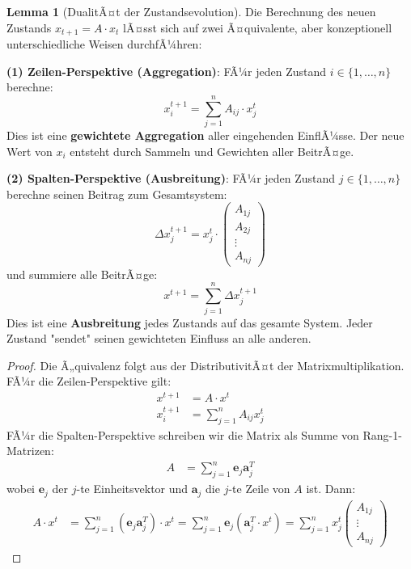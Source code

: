 ﻿\documentclass[a4paper,12pt]{report}
\theoremstyle{definition}
\newtheorem{lemma}{Lemma}
\begin{document}
	\begin{lemma}[DualitÃ¤t der Zustandsevolution]
		Die Berechnung des neuen Zustands $x_{t+1} = A \cdot x_t$ lÃ¤sst sich auf zwei Ã¤quivalente, aber konzeptionell unterschiedliche Weisen durchfÃ¼hren:
		
		\textbf{(1) Zeilen-Perspektive (Aggregation)}:
		FÃ¼r jeden Zustand $i \in \{1,\ldots,n\}$ berechne:
		\[
		x_i^{t+1} = \sum_{j=1}^{n} A_{ij} \cdot x_j^t
		\]
		Dies ist eine \textbf{gewichtete Aggregation} aller eingehenden EinflÃ¼sse. Der neue Wert von $x_i$ entsteht durch Sammeln und Gewichten aller BeitrÃ¤ge.
		
		\textbf{(2) Spalten-Perspektive (Ausbreitung)}:
		FÃ¼r jeden Zustand $j \in \{1,\ldots,n\}$ berechne seinen Beitrag zum Gesamtsystem:
		\[
		\Delta x^{t+1}_j = x_j^t \cdot \begin{pmatrix} A_{1j} \\ A_{2j} \\ \vdots \\ A_{nj} \end{pmatrix}
		\]
		und summiere alle BeitrÃ¤ge:
		\[
		x^{t+1} = \sum_{j=1}^{n} \Delta x^{t+1}_j
		\]
		Dies ist eine \textbf{Ausbreitung} jedes Zustands auf das gesamte System. Jeder Zustand "sendet" seinen gewichteten Einfluss an alle anderen.
	\end{lemma}
	
	\begin{proof}
		Die Ã„quivalenz folgt aus der DistributivitÃ¤t der Matrixmultiplikation. FÃ¼r die Zeilen-Perspektive gilt:
		\begin{align}
			x^{t+1} &= A \cdot x^t \\
			x_i^{t+1} &= \sum_{j=1}^n A_{ij} x_j^t
		\end{align}
		FÃ¼r die Spalten-Perspektive schreiben wir die Matrix als Summe von Rang-1-Matrizen:
		\begin{align}
			A &= \sum_{j=1}^n \mathbf{e}_j \mathbf{a}_j^T
		\end{align}
		wobei $\mathbf{e}_j$ der $j$-te Einheitsvektor und $\mathbf{a}_j$ die $j$-te Zeile von $A$ ist. Dann:
		\begin{align}
			A \cdot x^t &= \sum_{j=1}^n (\mathbf{e}_j \mathbf{a}_j^T) \cdot x^t = \sum_{j=1}^n \mathbf{e}_j (\mathbf{a}_j^T \cdot x^t) = \sum_{j=1}^n x_j^t \begin{pmatrix} A_{1j} \\ \vdots \\ A_{nj} \end{pmatrix}
		\end{align}
	\end{proof}
	
\end{document}

